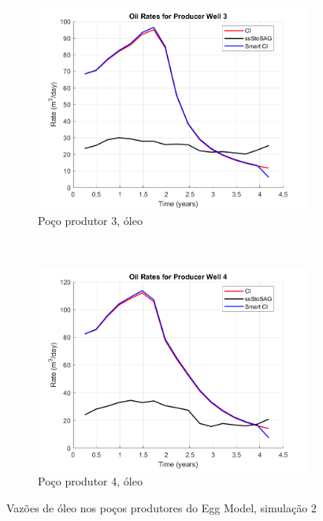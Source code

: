 \begin{figure}[!ht]
	\begin{subfigure}[b]{.45\textwidth}
		\includegraphics[width=\textwidth]{figs/resultadosEgg/imgsim2/EGG_OilWell3_Zoom}
		\caption{Po\c{c}o produtor 3, \'{o}leo}
		\label{EGG2_OilWell3}
	\end{subfigure}
	~
	\begin{subfigure}[b]{.45\textwidth}
		\includegraphics[width=\textwidth]{figs/resultadosEgg/imgsim2/EGG_OilWell4_Zoom}
		\caption{Po\c{c}o produtor 4, \'{o}leo}
		\label{EGG2_OilWell4}
	\end{subfigure}
	\caption{Vaz\~{o}es de \'{o}leo nos po\c{c}os produtores do Egg Model, simula\c{c}\~{a}o 2}
	\label{EGG2_OilRates}
\end{figure}

